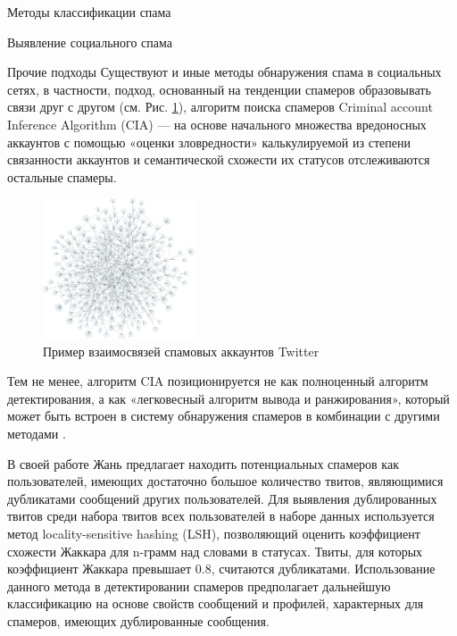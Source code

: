 \begin{section}{Методы классификации спама}
\begin{subsection}{Выявление социального спама}
\end{subsection}

\begin{subsection}{Прочие подходы}
Существуют и иные методы обнаружения спама в социальных
сетях, в частности, подход, основанный на тенденции спамеров
образовывать связи друг с другом (см. Рис. \ref{pic:GraphOfTwitterSpammers}),
алгоритм поиска спамеров Criminal account Inference Algorithm (CIA) —
на основе начального множества вредоносных аккаунтов с помощью
«оценки зловредности» калькулируемой из степени связанности аккаунтов и семантической схожести их статусов
отслеживаются остальные спамеры.
\begin{figure}[ht!]
\centering
\includegraphics[width=0.4\textwidth]{pics/GraphOfTwitterSpammers}
\caption{Пример взаимосвязей спамовых аккаунтов Twitter}
\label{pic:GraphOfTwitterSpammers}
\end{figure}
Тем не менее, алгоритм CIA позиционируется не как полноценный алгоритм детектирования, а как «легковесный алгоритм вывода и ранжирования», который может быть встроен в систему обнаружения спамеров в комбинации с другими методами \cite{Chao}.

В своей работе Жань \cite{Zhang} предлагает находить потенциальных спамеров как пользователей, имеющих достаточно большое количество твитов, являющимися дубликатами сообщений других пользователей.
Для выявления дублированных твитов среди набора твитов всех пользователей в наборе данных используется метод locality-sensitive hashing (LSH),
 позволяющий оценить коэффициент схожести Жаккара для n-грамм над словами в статусах. Твиты, для которых коэффициент Жаккара превышает 0.8,
 считаются дубликатами. Использование данного метода в детектировании спамеров предполагает дальнейшую классификацию на основе свойств сообщений и профилей,
 характерных для спамеров, имеющих дублированные сообщения.

\end{subsection}

\end{section}
